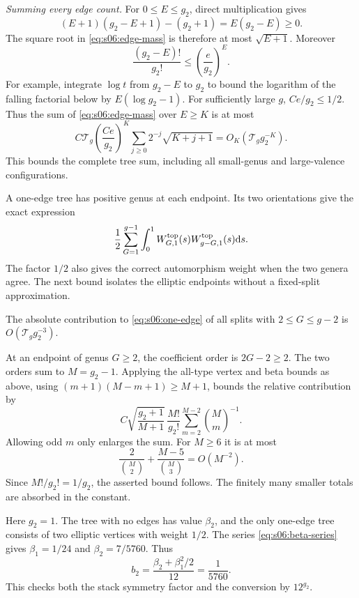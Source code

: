 \begin{prf}
\emph{Summing every edge count.}
For $0\leq E\leq g_2$, direct multiplication gives
\[
 (E+1)(g_2-E+1)-(g_2+1)=E(g_2-E)\geq0.
\]
The square root in \eqref{eq:s06:edge-mass} is therefore at most
$\sqrt{E+1}$. Moreover
\[
 \frac{(g_2-E)!}{g_2!}\leq\left(\frac e{g_2}\right)^E.
\]
For example, integrate $\log t$ from $g_2-E$ to $g_2$ to bound
the logarithm of the falling factorial below by
$E(\log g_2-1)$. For sufficiently large $g$, $Ce/g_2\leq1/2$.
Thus the sum of \eqref{eq:s06:edge-mass} over $E\geq K$ is at most
\[
 C\mathcal T_g\left(\frac{Ce}{g_2}\right)^K
       \sum_{j\geq0}2^{-j}\sqrt{K+j+1}
 =O_K(\mathcal T_g g_2^{-K}).
\]
This bounds the complete tree sum, including all small-genus and
large-valence configurations.
\end{prf}

A one-edge tree has positive genus at each endpoint. Its two
orientations give the exact expression
\begin{equation}\label{eq:s06:one-edge}
 \frac12\sum_{G=1}^{g-1}\int_0^1
       W^{\rm top}_{G,1}(s)W^{\rm top}_{g-G,1}(s)\mathrm{d} s.
\end{equation}
The factor $1/2$ also gives the correct automorphism weight when the
two genera agree. The next bound isolates the elliptic endpoints
without a fixed-split approximation.

\begin{lmm}\label{lmm:s06:nonelliptic-tail}
The absolute contribution to \eqref{eq:s06:one-edge} of all splits
with $2\leq G\leq g-2$ is $O(\mathcal T_g g_2^{-3})$.
\end{lmm}
\begin{prf}
At an endpoint of genus $G\geq2$, the coefficient order is
$2G-2\geq2$. The two orders sum to $M=g_2-1$.
Applying the all-type vertex and beta bounds as above, using
$(m+1)(M-m+1)\geq M+1$, bounds the relative contribution by
\[
 C\sqrt{\frac{g_2+1}{M+1}}\,
       \frac{M!}{g_2!}
       \sum_{m=2}^{M-2}\binom{M}{m}^{-1}.
\]
Allowing odd $m$ only enlarges the sum. For $M\geq6$ it is at most
\[
 \frac2{\binom M2}+\frac{M-5}{\binom M3}=O(M^{-2}).
\]
Since $M!/g_2!=1/g_2$, the asserted bound follows. The finitely
many smaller totals are absorbed in the constant.
\end{prf}

\begin{exm}
Here $g_2=1$. The tree with no edges has value $\beta_2$, and the only
one-edge tree consists of two elliptic vertices with weight $1/2$.
The series \eqref{eq:s06:beta-series} gives
$\beta_1=1/24$ and $\beta_2=7/5760$. Thus
\[
 b_2=\frac{\beta_2+\beta_1^2/2}{12}=\frac1{5760}.
\]
This checks both the stack symmetry factor and the conversion by
$12^{g_2}$.
\end{exm}
